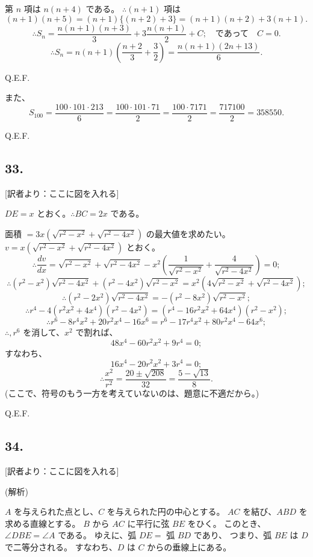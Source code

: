 第 $n$ 項は $n(n+4)$ である。
$\therefore (n+1)$ 項は
\[
(n + 1)(n + 5) = (n+1)\{ (n+2)+3 \}
= (n+1)(n+2) + 3(n+1).
\]
\[
\therefore
S_n = \frac{n(n+1)(n+3)}{3} + 3 \frac{n(n+1)}{2} + C;
\quad \mbox{であって} \quad
C = 0.
\]
\[
\therefore
S_n = n(n+1)\left( \frac{n+2}{3} + \frac{3}{2} \right)
= \frac{n(n+1)(2n+13)}{6}.
\]

Q.E.F.

また、
\[
S_{100} = \frac{100 \cdot 101 \cdot 213}{6}
= \frac{100 \cdot 101 \cdot 71}{2}
= \frac{100 \cdot 7171}{2}
= \frac{717100}{2} = 358550.
\]

Q.E.F.

\subsection*{33.}

[訳者より：ここに図を入れる]

$DE = x$ とおく。$\therefore BC = 2x$ である。

面積 $= 3x(\sqrt{r^2 - x^2} + \sqrt{r^2 - 4x^2})$ の最大値を求めたい。
$v = x(\sqrt{r^2 - x^2} + \sqrt{r^2 - 4x^2})$ とおく。
\[
\therefore
\frac{dv}{dx} = \sqrt{r^2 - x^2} + \sqrt{r^2 - 4x^2}
 - x^2 \left( \frac{1}{\sqrt{r^2 - x^2}} + \frac{4}{\sqrt{r^2 - 4x^2}}
      \right)
 = 0;
\]
\[
\therefore
(r^2 - x^2) \sqrt{r^2 - 4x^2}
+ (r^2 - 4x^2) \sqrt{r^2 - x^2}
= x^2 (4 \sqrt{r^2 - x^2} + \sqrt{r^2 - 4x^2});
\]
\[
\therefore
(r^2 - 2 x^2) \sqrt{r^2 - 4x^2}
= - (r^2 - 8 x^2) \sqrt{r^2 - x^2};
\]
\[
\therefore
r^4 - 4 (r^2 x^2 + 4 x^4)(r^2 - 4x^2)
 = (r^4 - 16 r^2 x^2 + 64 x^4)(r^2 - x^2);
 \]
\[
\therefore
r^6 - 8r^4 x^2 + 20 r^2 x^4 - 16 x^6
 = r^6 - 17 r^4 x^2 + 80 r^2 x^4 - 64 x^6;
 \]
$\therefore, r^6$ を消して、$x^2$ で割れば、
\[
48x^4 - 60 r^2 x^2 + 9r^4 = 0;
\]
すなわち、
\[
16x^4 - 20 r^2 x^2 + 3r^4 = 0;
\]
\[
\therefore
\frac{x^2}{r^2} = \frac{20 \pm \sqrt{208}}{32}
 = \frac{5 - \sqrt{13}}{8}.
 \]
(ここで、符号のもう一方を考えていないのは、題意に不適だから。)

Q.E.F.

\subsection*{34.}

[訳者より：ここに図を入れる] 

(解析)

$A$ を与えられた点とし、$C$ を与えられた円の中心とする。
$AC$ を結び、$ABD$ を求める直線とする。
$B$ から $AC$ に平行に弦 $BE$ をひく。
このとき、$\angle DBE = \angle A$ である。
ゆえに、弧 $DE = $ 弧 $BD$ であり、
つまり、弧 $BE$ は $D$ で二等分される。
すなわち、$D$ は $C$ からの垂線上にある。

